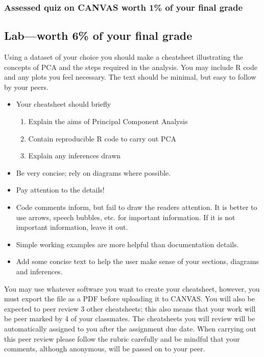 \documentclass{article}
\begin{document}
\subsubsection*{Assessed quiz on CANVAS worth 1\% of your final grade}



\subsection*{Lab---worth 6\% of your final grade}

Using a dataset of your choice you should make a cheatsheet illustrating the concepts of PCA and the steps required in the analysis. You may include R code and any plots you feel necessary. The text should be minimal, but easy to follow by your peers. 

\begin{itemize}

\item Your cheatsheet should briefly
  \begin{enumerate}
  \item Explain the aims of Principal Component Analysis
  \item Contain reproducible R code to carry out PCA
  \item Explain any inferences drawn
  \end{enumerate}
  
\item Be very concise; rely on diagrams where possible.

\item Pay attention to the details!

\item Code comments inform, but fail to draw the readers attention. It is better to use arrows, speech bubbles, etc. for important information. If it is not important information, leave it out.

\item Simple working examples are more helpful than documentation details.

\item Add some concise text to help the user make sense of your sections, diagrams and inferences.
\end{itemize}

You may use whatever software you want to create your cheatsheet, however, you must export the file as a PDF before uploading it to CANVAS. You will also be expected to peer review 3 other cheatsheets; this also means that your work will be peer marked by 4 of your classmates. The cheatsheets you will review will be automatically assigned to you after the assignment due date. When carrying out this peer review please follow the rubric carefully and be mindful that your comments, although anonymous, will be passed on to your peer.
\end{document}
